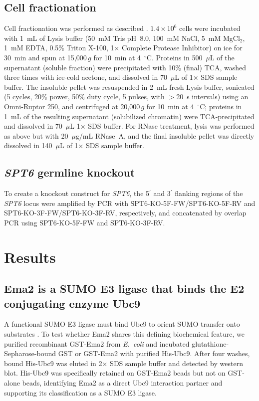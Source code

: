 \documentclass[11pt,a4paper]{article}
\begin{document}
\subsection{Cell fractionation}
Cell fractionation was performed as described \citep{Ali2018}. $1.4 \times 10^{6}$ cells were incubated with 1~mL of Lysis buffer (50~mM Tris pH~8.0, 100~mM NaCl, 5~mM MgCl$_2$, 1~mM EDTA, 0.5\% Triton X-100, 1$\times$ Complete Protease Inhibitor) on ice for 30~min and spun at 15{,}000$\,g$ for 10~min at 4~$^\circ$C. Proteins in 500~$\mu$L of the supernatant (soluble fraction) were precipitated with 10\% (final) TCA, washed three times with ice-cold acetone, and dissolved in 70~$\mu$L of 1$\times$ SDS sample buffer. The insoluble pellet was resuspended in 2~mL fresh Lysis buffer, sonicated (5 cycles, 20\% power, 50\% duty cycle, 5 pulses, with $>$20~s intervals) using an Omni-Ruptor 250, and centrifuged at 20{,}000$\,g$ for 10~min at 4~$^\circ$C; proteins in 1~mL of the resulting supernatant (solubilized chromatin) were TCA-precipitated and dissolved in 70~$\mu$L 1$\times$ SDS buffer. For RNase treatment, lysis was performed as above but with 20~$\mu$g/mL RNase~A, and the final insoluble pellet was directly dissolved in 140~$\mu$L of 1$\times$ SDS sample buffer.

\subsection{\textit{SPT6} germline knockout}
To create a knockout construct for \textit{SPT6}, the 5$^\prime$ and 3$^\prime$ flanking regions of the \textit{SPT6} locus were amplified by PCR with SPT6-KO-5F-FW/SPT6-KO-5F-RV and SPT6-KO-3F-FW/SPT6-KO-3F-RV, respectively, and concatenated by overlap PCR using SPT6-KO-5F-FW and SPT6-KO-3F-RV.

\section{Results}

\subsection{Ema2 is a SUMO E3 ligase that binds the E2 conjugating enzyme Ubc9}
A functional SUMO E3 ligase must bind Ubc9 to orient SUMO transfer onto substrates \citep{Gareau2010}. To test whether Ema2 shares this defining biochemical feature, we purified recombinant GST-Ema2 from \textit{E.~coli} and incubated glutathione-Sepharose-bound GST or GST-Ema2 with purified His-Ubc9. After four washes, bound His-Ubc9 was eluted in 2$\times$ SDS sample buffer and detected by western blot. His-Ubc9 was specifically retained on GST-Ema2 beads but not on GST-alone beads, identifying Ema2 as a direct Ubc9 interaction partner and supporting its classification as a SUMO E3 ligase.
\end{document}
